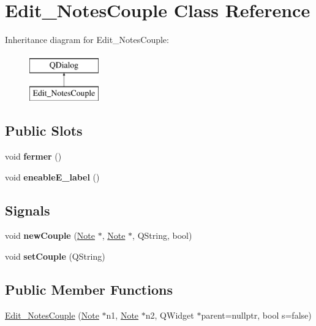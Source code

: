 \hypertarget{class_edit___notes_couple}{}\section{Edit\+\_\+\+Notes\+Couple Class Reference}
\label{class_edit___notes_couple}
Inheritance diagram for Edit\+\_\+\+Notes\+Couple\+:\begin{figure}[H]
\begin{center}
\leavevmode
\includegraphics[height=2.000000cm]{class_edit___notes_couple}
\end{center}
\end{figure}
\subsection*{Public Slots}
\begin{DoxyCompactItemize}
\item 
\mbox{\label{class_edit___notes_couple_a4eb0c74a8e7428aa585136878ddf1edb}} 
void {\bfseries fermer} ()
\item 
\mbox{\label{class_edit___notes_couple_ad51b47f9284bea44cddc186674c57bc9}} 
void {\bfseries eneable\+E\+\_\+label} ()
\end{DoxyCompactItemize}
\subsection*{Signals}
\begin{DoxyCompactItemize}
\item 
\mbox{\label{class_edit___notes_couple_a4cf6489e93bef94d95fe460b195ba13d}} 
void {\bfseries new\+Couple} (\hyperlink{class_note}{Note} $\ast$, \hyperlink{class_note}{Note} $\ast$, Q\+String, bool)
\item 
\mbox{\label{class_edit___notes_couple_af5c4267cc253eb46628a89e2f14dadf6}} 
void {\bfseries set\+Couple} (Q\+String)
\end{DoxyCompactItemize}
\subsection*{Public Member Functions}
\begin{DoxyCompactItemize}
\item 
\hyperlink{class_edit___notes_couple_aa0780f3a53175747c5a7136d4f2ffa30}{Edit\+\_\+\+Notes\+Couple} (\hyperlink{class_note}{Note} $\ast$n1, \hyperlink{class_note}{Note} $\ast$n2, Q\+Widget $\ast$parent=nullptr, bool s=false)
\end{DoxyCompactItemize}


